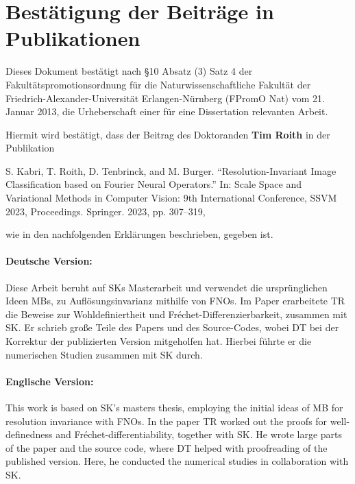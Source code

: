 \documentclass[12pt]{article}
\begin{document}
\section*{Bestätigung der Beiträge in Publikationen}

Dieses Dokument bestätigt nach \S10 Absatz (3) Satz 4 der Fakultätspromotionsordnung für die Naturwissenschaftliche Fakultät der
Friedrich-Alexander-Universität Erlangen-Nürnberg (FPromO Nat) vom 21. Januar 2013, die Urheberschaft einer für eine Dissertation relevanten Arbeit.\par

\vspace{15pt}
\noindent
Hiermit wird bestätigt, dass der Beitrag des Doktoranden \textbf{Tim Roith} in der Publikation
%
\begin{center}
S. Kabri, T. Roith, D. Tenbrinck, and M. Burger. “Resolution-Invariant
Image Classification based on Fourier Neural Operators.” In: Scale Space
and Variational Methods in Computer Vision: 9th International Conference,
SSVM 2023, Proceedings. Springer. 2023, pp. 307–319,
\end{center}
%
wie in den nachfolgenden Erklärungen beschrieben, gegeben ist.

\paragraph{Deutsche Version:} Diese Arbeit beruht auf SKs Masterarbeit und verwendet die ursprünglichen Ideen MBs, zu Auflösungsinvarianz mithilfe von FNOs. Im Paper erarbeitete TR die Beweise zur Wohldefiniertheit und Fréchet-Differenzierbarkeit, zusammen mit SK. Er schrieb große Teile des Papers und des Source-Codes, wobei DT bei der Korrektur der publizierten Version mitgeholfen hat. Hierbei führte er die numerischen Studien zusammen mit SK durch. 

\paragraph{Englische Version:} This work is based on SK's masters thesis, employing the initial ideas of MB for resolution invariance with FNOs. In the paper TR worked out the proofs for well-definedness and Fréchet-differentiability, together with SK. He wrote large parts of the paper and the source code, where DT helped with proofreading of the published version. Here, he conducted the numerical studies in collaboration with SK.
\vspace{50pt}
\end{document}
